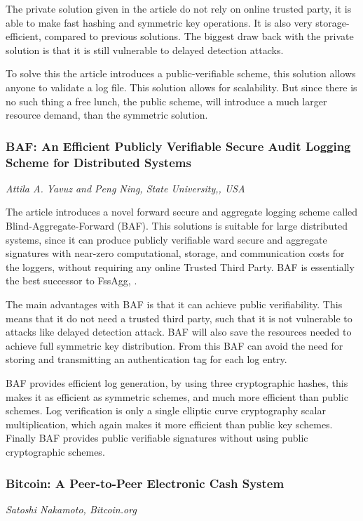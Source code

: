 The private solution given in the article do not rely on online
trusted party, it is able to make fast hashing and symmetric key
operations. It is also very storage-efficient, compared to previous
solutions. The biggest draw back with the private solution is that it
is still vulnerable to delayed detection attacks.

To solve this the article introduces a public-verifiable scheme, this
solution allows anyone to validate a log file. This solution allows
for scalability. But since there is no such thing a free lunch, the
public scheme, will introduce a much larger resource demand, than the
symmetric solution.~\cite{ma}


\subsubsection{BAF: An Efficient Publicly Verifiable Secure Audit Logging Scheme for Distributed Systems}
\vspace{-3mm}
{\footnotesize \it Attila A. Yavuz and Peng Ning, State University,, USA}~\cite{baf}

The article introduces a novel forward secure and aggregate logging
scheme called Blind-Aggregate-Forward (BAF). This solutions is
suitable for large distributed systems, since it can produce publicly
verifiable ward secure and aggregate signatures with near-zero
computational, storage, and communication costs for the loggers,
without requiring any online Trusted Third Party.  BAF is essentially
the best successor to FssAgg, .

The main advantages with BAF is that it can achieve public
verifiability. This means that it do not need a trusted third party,
such that it is not vulnerable to attacks like delayed detection
attack. BAF will also save the resources needed to achieve full
symmetric key distribution. From this BAF can avoid the need for
storing and transmitting an authentication tag for each log entry.

BAF provides efficient log generation, by using three cryptographic
hashes, this makes it as efficient as symmetric schemes, and much more
efficient than public schemes. Log verification is only a single
elliptic curve cryptography scalar multiplication, which again makes
it more efficient than public key schemes. Finally BAF provides public
verifiable signatures without using public cryptographic
schemes.~\cite{baf}

\subsubsection{Bitcoin: A Peer-to-Peer Electronic Cash System}
\vspace{-3mm}
{\footnotesize \it Satoshi Nakamoto, Bitcoin.org}~\cite{nakamoto}

